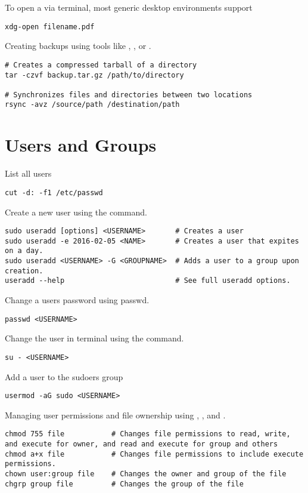 To open a  via terminal, most generic desktop environments support
\begin{lstlisting}
xdg-open filename.pdf
\end{lstlisting}

Creating backups using tools like , , or .
\begin{lstlisting}
# Creates a compressed tarball of a directory
tar -czvf backup.tar.gz /path/to/directory

# Synchronizes files and directories between two locations
rsync -avz /source/path /destination/path
\end{lstlisting}











\section{Users and Groups}

List all users
\begin{lstlisting}
cut -d: -f1 /etc/passwd
\end{lstlisting}

Create a new user using the  command.
\begin{lstlisting}
sudo useradd [options] <USERNAME>       # Creates a user
sudo useradd -e 2016-02-05 <NAME>       # Creates a user that expites on a day.
sudo useradd <USERNAME> -G <GROUPNAME>  # Adds a user to a group upon creation.
useradd --help                          # See full useradd options.
\end{lstlisting}

Change a users password using passwd.
\begin{lstlisting}
passwd <USERNAME>
\end{lstlisting}

Change the user in terminal using the  command.
\begin{lstlisting}
su - <USERNAME>
\end{lstlisting}

Add a user to the sudoers group
\begin{lstlisting}
usermod -aG sudo <USERNAME>
\end{lstlisting}

Managing user permissions and file ownership using , , and .
\begin{lstlisting}
chmod 755 file           # Changes file permissions to read, write, and execute for owner, and read and execute for group and others
chmod a+x file           # Changes file permissions to include execute permissions.
chown user:group file    # Changes the owner and group of the file
chgrp group file         # Changes the group of the file
\end{lstlisting}












